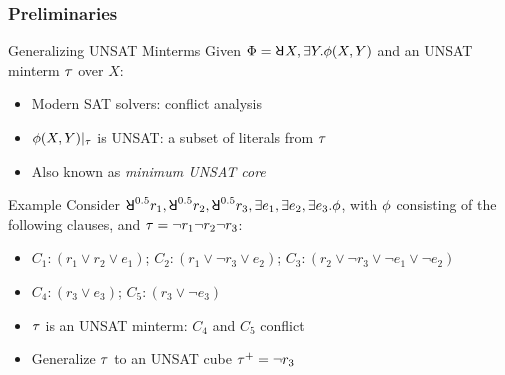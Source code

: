 \begin{frame}
  \frametitle{Preliminaries}
  \begin{block}{Generalizing UNSAT Minterms}
    Given $\Qf=\random{} X,\exists Y.\pf(X,Y)$ and an UNSAT minterm $\tau$ over $X$:
    \pause
    \begin{itemize}
      \item Modern SAT solvers: conflict analysis
            \pause
      \item $\phi(X,Y)|_{\tau}$ is UNSAT: a subset of literals from $\tau$
            \pause
      \item Also known as \textit{minimum UNSAT core}
            \pause
    \end{itemize}
  \end{block}
  \begin{block}{Example}
    Consider $\random{0.5}r_1,\random{0.5}r_2,\random{0.5}r_3,\exists e_1,\exists e_2,\exists e_3.\pf$,
    with $\phi$ consisting of the following clauses, and $\tau=\lnot r_1\lnot r_2\lnot r_3$:
    \begin{itemize}
      \item[] $C_1: (r_1 \lor r_2 \lor e_1)$; $C_2: (r_1 \lor \lnot r_3 \lor e_2)$; $C_3: (r_2 \lor \lnot r_3 \lor \lnot e_1 \lor \lnot e_2)$
      \item[] $C_4: (r_3 \lor e_3)$; $C_5: (r_3 \lor \lnot e_3)$
            \pause
    \end{itemize}
    \begin{itemize}
      \item $\tau$ is an UNSAT minterm: $C_4$ and $C_5$ conflict
            \pause
      \item Generalize $\tau$ to an UNSAT cube $\tau^+=\lnot r_3$
    \end{itemize}
  \end{block}
\end{frame}